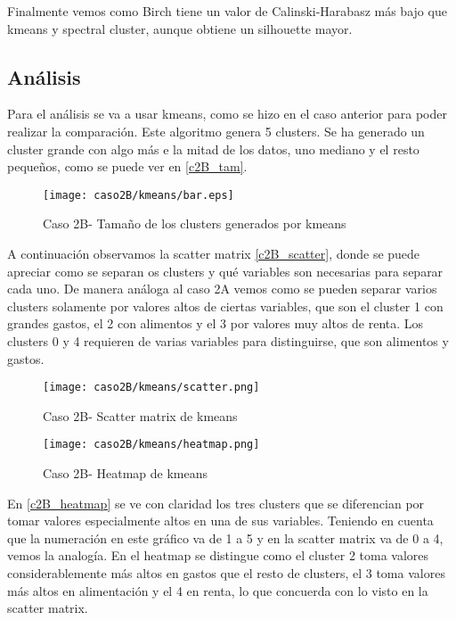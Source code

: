 Finalmente vemos como Birch tiene un valor de Calinski-Harabasz más bajo que kmeans y spectral cluster, aunque obtiene un silhouette mayor.

\subsection{Análisis}


Para el análisis se va a usar kmeans, como se hizo en el caso anterior para poder realizar la comparación. Este algoritmo genera 5 clusters. Se ha generado un cluster grande con algo más e la mitad de los datos, uno mediano y el resto pequeños, como se puede ver en \eqref{c2B_tam}.

\begin{figure}[H]
\caption{Caso 2B- Tamaño de los clusters generados por kmeans}
\label{c2B_tam}
\texttt{[image: caso2B/kmeans/bar.eps]}
\end{figure}

A continuación observamos la scatter matrix \eqref{c2B_scatter}, donde se puede apreciar como se separan os clusters y qué variables son necesarias para separar cada uno. De manera análoga al caso 2A vemos como se pueden separar varios clusters solamente por valores altos de ciertas variables, que son el cluster 1 con grandes gastos, el 2 con alimentos y el 3 por valores muy altos de renta. Los clusters 0 y 4 requieren de varias variables para distinguirse, que son alimentos y gastos.

\begin{figure}[H]
\caption{Caso 2B- Scatter matrix de kmeans}
\label{c2B_scatter}
\texttt{[image: caso2B/kmeans/scatter.png]}
\end{figure}


\begin{figure}[H]
\caption{Caso 2B- Heatmap de kmeans}
\label{c2B_heatmap}
\texttt{[image: caso2B/kmeans/heatmap.png]}
\end{figure}

En \eqref{c2B_heatmap} se ve con claridad los tres clusters que se diferencian por tomar valores especialmente altos en una de sus variables. Teniendo en cuenta que la numeración en este gráfico va de 1 a 5 y en la scatter matrix va de 0 a 4, vemos la analogía. En el heatmap se distingue como el cluster 2 toma valores considerablemente más altos en gastos que el resto de clusters, el 3 toma valores más altos en alimentación y el 4 en renta, lo que concuerda con lo visto en la scatter matrix.


